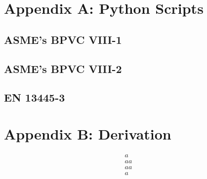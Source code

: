\renewcommand{\thesection}{A.\arabic{section}}
\chapter{Appendix A: Python Scripts}
\label{appendix:a}
\nopagebreak
\begin{small}

	\section{ASME's BPVC VIII-1}
	\label{appendix:a1}
	
	\pagebreak
	
	\section{ASME's BPVC VIII-2}
	\label{appendix:a2}
	
	\pagebreak
	
	\section{EN 13445-3}
	\label{appendix:a3}
	

\end{small}

\renewcommand{\thesection}{B.\arabic{section}}
\chapter{Appendix B: Derivation}
\label{appendix:b}


\begin{equation*}
	\begin{aligned}
	a\\
	aa\\
	aa\\
	a
	\end{aligned}
\end{equation*}
